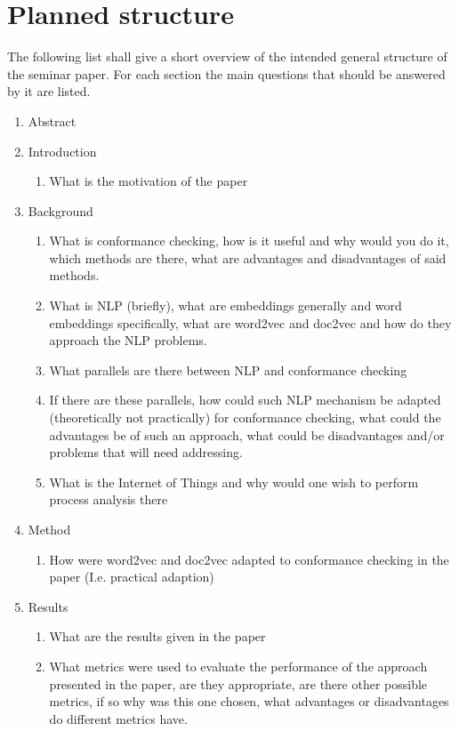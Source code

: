 \documentclass[runningheads]{template/llncs}
\begin{document}
\section{Planned structure}
The following list shall give a short overview of the intended general structure of the seminar paper. For each section the main questions that should be answered by it are listed.
\begin{enumerate}
	\item Abstract
	\item Introduction
	\begin{enumerate}
		\item What is the motivation of the paper
	\end{enumerate}
	\item Background
	\begin{enumerate}
		\item What is conformance checking, how is it useful and why would you do it, which methods are there, what are advantages and disadvantages of said methods.
		\item What is NLP (briefly), what are embeddings generally and word embeddings specifically, what are word2vec and doc2vec and how do they approach the NLP problems.
		\item What parallels are there between NLP and conformance checking
		\item If there are these parallels, how could such NLP mechanism be adapted (theoretically not practically) for conformance checking, what could the advantages be of such an approach, what could be disadvantages and/or problems that will need addressing.
		\item What is the Internet of Things and why would one wish to perform process analysis there
	\end{enumerate}
	\item Method
	\begin{enumerate}
		\item How were word2vec and doc2vec adapted to conformance checking in the paper (I.e. practical adaption)
	\end{enumerate}
	\item Results
	\begin{enumerate}
		\item What are the results given in the paper
		\item What metrics were used to evaluate the performance of the approach presented in the paper, are they appropriate, are there other possible metrics, if so why was this one chosen, what advantages or disadvantages do different metrics have.

\end{enumerate}
\end{enumerate}
\end{document}
